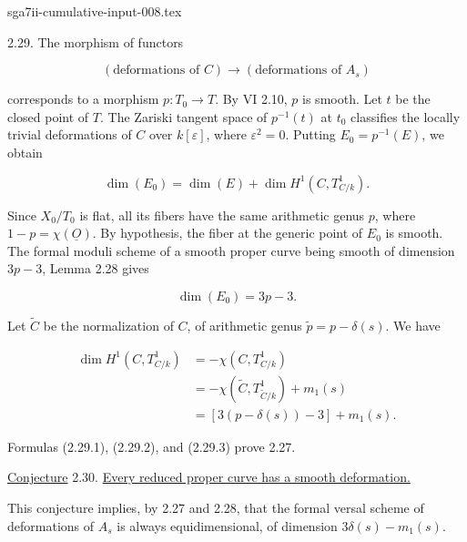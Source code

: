 \begin{filecontents*}{sga7ii-cumulative-input-008.tex}

2.29. The morphism of functors

\begin{equation*}
(\text{deformations of }C)\longrightarrow(\text{deformations of }A_s)
\end{equation*}

corresponds to a morphism $p:T_0\longrightarrow T$.  By VI 2.10, $p$ is
smooth.  Let $t$ be the closed point of $T$.  The Zariski tangent space of
$p^{-1}(t)$ at $t_0$ classifies the locally trivial deformations of $C$ over
$k[\varepsilon]$, where $\varepsilon^2=0$.  Putting $E_0=p^{-1}(E)$, we obtain

\begin{equation}\tag{2.29.1}
\dim(E_0)=\dim(E)+\dim H^1(C,T^1_{C/k}).
\end{equation}

Since $X_0/T_0$ is flat, all its fibers have the same arithmetic genus $p$,
where $1-p=\chi(\underline O)$.  By hypothesis, the fiber at the generic point
of $E_0$ is smooth.  The formal moduli scheme of a smooth proper curve being
smooth of dimension $3p-3$, Lemma 2.28 gives

\begin{equation}\tag{2.29.2}
\dim(E_0)=3p-3.
\end{equation}

Let $\widetilde C$ be the normalization of $C$, of arithmetic genus
$\widetilde p=p-\delta(s)$.  We have

\begin{equation}\tag{2.29.3}
\begin{aligned}
\dim H^1(C,T^1_{C/k})
&=-\chi(C,T^1_{C/k})\\
&=-\chi(\widetilde C,T^1_{\widetilde C/k})+m_1(s)\\
&=[3(p-\delta(s))-3]+m_1(s).
\end{aligned}
\end{equation}

Formulas (2.29.1), (2.29.2), and (2.29.3) prove 2.27.

\underline{Conjecture} 2.30. \underline{Every reduced proper curve has a
smooth deformation.}

This conjecture implies, by 2.27 and 2.28, that the formal versal scheme of
deformations of $A_s$ is always equidimensional, of dimension
$3\delta(s)-m_1(s)$.
\end{filecontents*}

